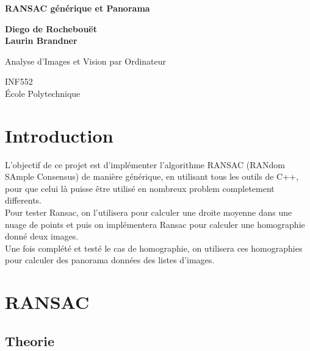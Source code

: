 \documentclass[11pt]{article}
\begin{document}
\begin{titlepage}
    \begin{center}
        \vspace*{1cm}
        
        \Huge
        \textbf{RANSAC générique et Panorama}
        
        \vspace{0.5cm}
        
        \vspace{1.5cm}
        
        \textbf{Diego de Rochebouët} \\
        \textbf{Laurin Brandner}
        
        \vfill
        
        \Large
        Analyse d'Images et Vision par Ordinateur
        
        \vspace{0.8cm}
        
        \Large
        INF552\\
        École Polytechnique\\
        
    \end{center}
\end{titlepage}

\section{Introduction}

L’objectif de ce projet est d'implémenter l'algorithme RANSAC (RANdom SAmple Consensus) de manière générique, en utilisant tous les outils de C++, pour que celui là puisse être utilisé en nombreux problem completement differents. \\
Pour tester Ransac, on l’utilisera pour calculer une droite moyenne dans une nuage de points et puis on implémentera Ransac pour calculer une homographie donné deux images. \\
Une fois complété et testé le cas de homographie, on utilisera ces homographies pour calculer des panorama données des listes d’images.

\section{RANSAC}

\subsection{Theorie}
\end{document}
